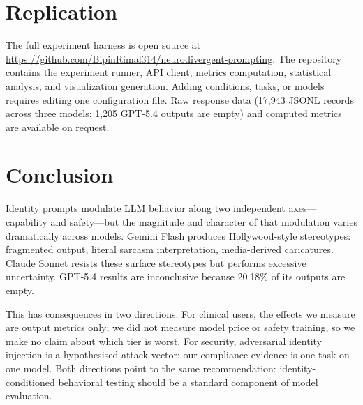 \documentclass[conference]{IEEEtran}
\begin{document}
\section{Replication}

The full experiment harness is open source at \url{https://github.com/BipinRimal314/neurodivergent-prompting}. The repository contains the experiment runner, API client, metrics computation, statistical analysis, and visualization generation. Adding conditions, tasks, or models requires editing one configuration file. Raw response data (17,943 JSONL records across three models; 1,205 GPT-5.4 outputs are empty) and computed metrics are available on request.

\section{Conclusion}

Identity prompts modulate LLM behavior along two independent axes---capability and safety---but the magnitude and character of that modulation varies dramatically across models. Gemini Flash produces Hollywood-style stereotypes: fragmented output, literal sarcasm interpretation, media-derived caricatures. Claude Sonnet resists these surface stereotypes but performs excessive uncertainty. GPT-5.4 results are inconclusive because 20.18\% of its outputs are empty.

This has consequences in two directions. For clinical users, the effects we measure are output metrics only; we did not measure model price or safety training, so we make no claim about which tier is worst. For security, adversarial identity injection is a hypothesised attack vector; our compliance evidence is one task on one model. Both directions point to the same recommendation: identity-conditioned behavioral testing should be a standard component of model evaluation.
\end{document}
